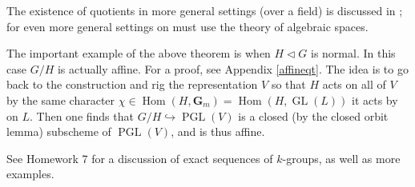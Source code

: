 \documentclass[10pt]{article}
\newcommand{\nsg}{\vartriangleleft}
\newcommand{\GL}{\operatorname{GL}}
\newcommand{\PGL}{\operatorname{PGL}}
\newcommand{\Hom}{\operatorname{Hom}}
\renewcommand{\(}{\left(}
\renewcommand{\)}{\right)}
\newcommand{\into}{\hookrightarrow}
\numberwithin{thm}{subsection}
\begin{document}
\begin{rem}The existence of quotients in more general settings (over a field)
is discussed in \cite[VI$_{\rm{A}}$]{sga3}; 
for even more general settings on must use the theory of algebraic spaces.
\end{rem}
\begin{ex}
The important example of the above theorem
is when $H\nsg G$ is normal. In this case $G/H$ is actually affine.
For a proof, see Appendix \ref{affineqt}.
The idea is to go back to the construction
and rig the representation $V$
so that $H$ acts on all of $V$
by the same character $\chi\in\Hom(H,\mathbf{G}_m)=\Hom(H,\GL(L))$ it acts
by on $L$.
Then one finds that $G/H\into\PGL(V)$ is a closed (by the closed orbit lemma) subscheme
of $\PGL(V)$, and is thus affine.
\end{ex}
\begin{rem} See Homework 7 for a discussion of exact sequences of $k$-groups,
as well as more examples.
\end{rem}
\end{document}
